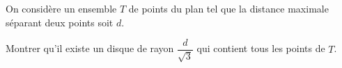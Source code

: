 On considère un ensemble $T$ de points du plan tel que la distance maximale séparant deux points soit $d$.

Montrer qu'il existe un disque de rayon $\dfrac{d}{\sqrt3}$ qui contient tous les points de $T$.